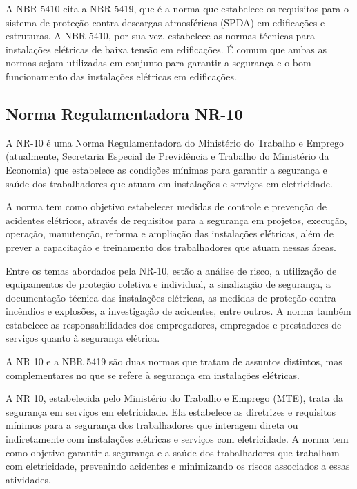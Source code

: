 \documentclass[a4paper, 12pt, onecolumn,singlespacing]{article}
\begin{document}
		
		A NBR 5410 cita a NBR 5419, que é a norma que estabelece os requisitos para o sistema de proteção contra descargas atmosféricas (SPDA) em edificações e estruturas. A NBR 5410, por sua vez, estabelece as normas técnicas para instalações elétricas de baixa tensão em edificações. É comum que ambas as normas sejam utilizadas em conjunto para garantir a segurança e o bom funcionamento das instalações elétricas em edificações.	
		
		\subsection{Norma Regulamentadora NR-10}
		
		A NR-10 é uma Norma Regulamentadora do Ministério do Trabalho e Emprego (atualmente, Secretaria Especial de Previdência e Trabalho do Ministério da Economia) que estabelece as condições mínimas para garantir a segurança e saúde dos trabalhadores que atuam em instalações e serviços em eletricidade.
		
		A norma tem como objetivo estabelecer medidas de controle e prevenção de acidentes elétricos, através de requisitos para a segurança em projetos, execução, operação, manutenção, reforma e ampliação das instalações elétricas, além de prever a capacitação e treinamento dos trabalhadores que atuam nessas áreas.
		
		Entre os temas abordados pela NR-10, estão a análise de risco, a utilização de equipamentos de proteção coletiva e individual, a sinalização de segurança, a documentação técnica das instalações elétricas, as medidas de proteção contra incêndios e explosões, a investigação de acidentes, entre outros. A norma também estabelece as responsabilidades dos empregadores, empregados e prestadores de serviços quanto à segurança elétrica.
		
		A NR 10 e a NBR 5419 são duas normas que tratam de assuntos distintos, mas complementares no que se refere à segurança em instalações elétricas.
		
		A NR 10, estabelecida pelo Ministério do Trabalho e Emprego (MTE), trata da segurança em serviços em eletricidade. Ela estabelece as diretrizes e requisitos mínimos para a segurança dos trabalhadores que interagem direta ou indiretamente com instalações elétricas e serviços com eletricidade. A norma tem como objetivo garantir a segurança e a saúde dos trabalhadores que trabalham com eletricidade, prevenindo acidentes e minimizando os riscos associados a essas atividades.
		
\end{document}
